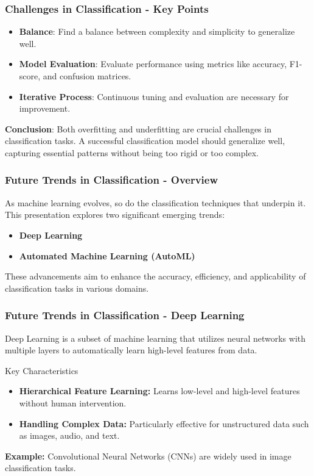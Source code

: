 \documentclass[aspectratio=169]{beamer}
\begin{document}
\begin{frame}[fragile]
    \frametitle{Challenges in Classification - Key Points}
    \begin{itemize}
        \item \textbf{Balance}: Find a balance between complexity and simplicity to generalize well.
        \item \textbf{Model Evaluation}: Evaluate performance using metrics like accuracy, F1-score, and confusion matrices.
        \item \textbf{Iterative Process}: Continuous tuning and evaluation are necessary for improvement.
    \end{itemize}
    
    \textbf{Conclusion}: Both overfitting and underfitting are crucial challenges in classification tasks. A successful classification model should generalize well, capturing essential patterns without being too rigid or too complex.
\end{frame}

\begin{frame}[fragile]
    \frametitle{Future Trends in Classification - Overview}
    As machine learning evolves, so do the classification techniques that underpin it. 
    This presentation explores two significant emerging trends: 
    \begin{itemize}
        \item \textbf{Deep Learning}
        \item \textbf{Automated Machine Learning (AutoML)}
    \end{itemize}
    These advancements aim to enhance the accuracy, efficiency, and applicability of classification tasks in various domains.
\end{frame}

\begin{frame}[fragile]
    \frametitle{Future Trends in Classification - Deep Learning}
    Deep Learning is a subset of machine learning that utilizes neural networks with multiple layers to automatically learn high-level features from data.

    \begin{block}{Key Characteristics}
        \begin{itemize}
            \item \textbf{Hierarchical Feature Learning:} Learns low-level and high-level features without human intervention.
            \item \textbf{Handling Complex Data:} Particularly effective for unstructured data such as images, audio, and text.
        \end{itemize}
    \end{block}

    \textbf{Example:} Convolutional Neural Networks (CNNs) are widely used in image classification tasks.
\end{frame}
\end{document}
